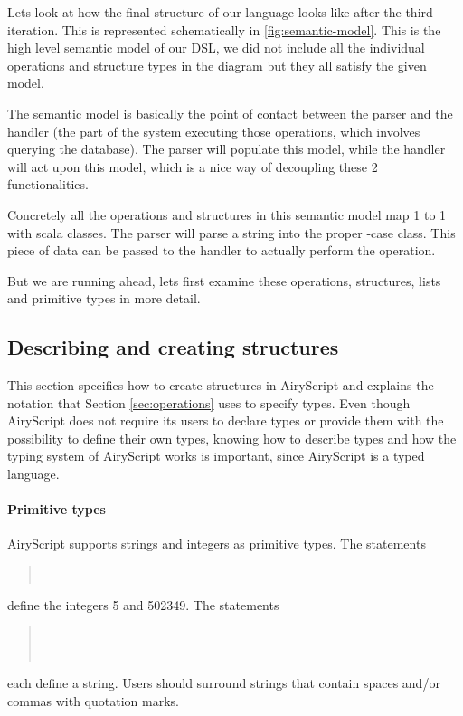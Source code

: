 Lets look at how the final structure of our language looks like after the
third iteration. This is represented schematically in \ref{fig:semantic-model}.
This is the high level semantic model of our DSL, we did not include all the
individual operations and structure types in the diagram but they all satisfy
the given model.

The semantic model is basically the point of contact between the parser and
the handler (the part of the system executing those operations, which involves
querying the database). The parser will populate this model, while the handler
will act upon this model, which is a nice way of decoupling these 2
functionalities.

Concretely all the operations and structures in this semantic model map 1 to 1
with scala classes. The parser will parse a string into the proper
-case class. This piece of data can be passed to the handler to
actually perform the operation.

But we are running ahead, lets first examine these operations, structures, lists
and primitive types in more detail.


\subsection{Describing and creating structures}
\label{sec:syntax_spec}
This section specifies how to create structures in AiryScript and explains the
notation that Section \ref{sec:operations} uses to specify types. Even though
AiryScript does not require its users to declare types or provide them with
the possibility to define their own types, knowing how to describe types and how
the typing system of AiryScript works is important, since AiryScript is a typed
language.

\paragraph{Primitive types}
AiryScript supports strings and integers as primitive types. The statements
\begin{quote}
  \\
\end{quote}
define the integers 5 and 502349. The statements
\begin{quote}
  \\
  \\
\end{quote}
each define a string. Users should surround strings that contain spaces and/or
commas with quotation marks.


